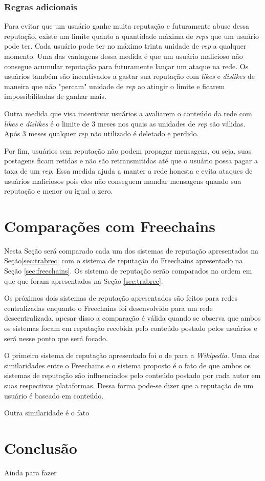 \documentclass[12pt]{article}
\newcommand{\FC} {Freechains\xspace}
\begin{document}
\subsubsection{Regras adicionais} \label{subsubsec:+regras}

Para evitar que um usuário ganhe muita reputação e futuramente abuse dessa reputação, existe um limite quanto a quantidade máxima de \emph{reps} que um usuário pode ter. Cada usuário pode ter no máximo trinta unidade de \emph{rep} a qualquer momento. Uma das vantagens dessa medida é que um usuário malicioso não consegue acumular reputação para futuramente lançar um ataque na rede. Os usuários também são incentivados a gastar sua reputação com \emph{likes} e \emph{dislikes} de maneira que não "percam" unidade de \emph{rep} ao atingir o limite e ficarem impossibilitadas de ganhar mais.

Outra medida que visa incentivar usuários a avaliarem o conteúdo da rede com \emph{likes} e \emph{dislikes} é o limite de 3 meses nos quais as unidades de \emph{rep} são válidas. Após 3 meses qualquer \emph{rep} não utilizado é deletado e perdido. 

Por fim, usuários sem reputação não podem propagar mensagens, ou seja, suas postagens ficam retidas e não são retransmitidas até que o usuário possa pagar a taxa de um \emph{rep}. Essa medida ajuda a manter a rede honesta e evita ataques de usuários maliciosos pois eles não conseguem mandar mensagens quando sua reputação e menor ou igual a zero.

\section{Comparações com \FC} \label{sec:comparacao}

Nesta Seção será comparado cada um dos sistemas de reputação apresentados na Seção\ref{sec:trabrec} com o sistema de reputação do \FC apresentado na Seção \ref{sec:freechains}. Os sistema de reputação serão comparados na ordem em que que foram apresentados na Seção \ref{sec:trabrec}.

Os próximos dois sistemas de reputação apresentados são feitos para redes centralizadas enquanto o \FC foi desenvolvido para um rede descentralizada, apesar disso a comparação é válida quando se observa que ambos os sistemas focam em reputação recebida pelo conteúdo postado pelos usuários e será nesse ponto que será focado.

O primeiro sistema de reputação apresentado foi o de \cite{adler2007content} para a \emph{Wikipedia}. Uma das similaridades entre o \FC e o sistema proposto é o fato de que ambos os sistemas de reputação são influenciados pelo conteúdo postado por cada autor em suas respectivas plataformas. Dessa forma pode-se dizer que a reputação de um usuário é baseado em conteúdo.

Outra similaridade é o fato 


\section{Conclusão}\label{sec:conclusao}

Ainda para fazer



\end{document}
